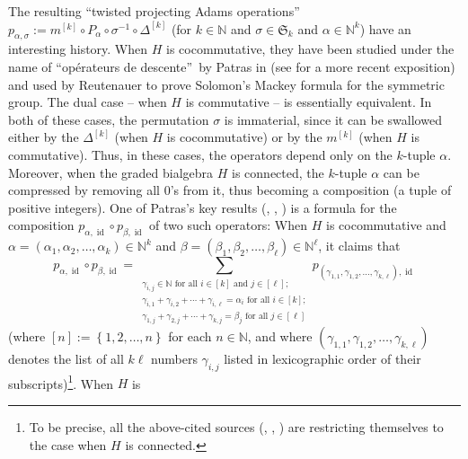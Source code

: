 \documentclass[numbers=enddot,12pt,final,onecolumn,notitlepage]{scrartcl}%
\theoremstyle{definition}
\let\sumnonlimits\sum
\renewcommand{\sum}{\sumnonlimits\limits}
\begin{document}
The resulting \textquotedblleft twisted projecting Adams
operations\textquotedblright\ $p_{\alpha,\sigma}:=m^{\left[  k\right]  }\circ
P_{\alpha}\circ\sigma^{-1}\circ\Delta^{\left[  k\right]  }$ (for
$k\in\mathbb{N}$ and $\sigma\in\mathfrak{S}_{k}$ and $\alpha\in\mathbb{N}^{k}%
$) have an interesting history. When $H$ is cocommutative, they have been
studied under the name of \textquotedblleft op\'{e}rateurs de
descente\textquotedblright\ by Patras in \cite{Patras94} (see \cite[\S 5.1]%
{CarPat21} for a more recent exposition) and used by Reutenauer \cite[\S 9.1]%
{Reuten93} to prove Solomon's Mackey formula for the symmetric group. The dual
case -- when $H$ is commutative -- is essentially equivalent. In both of these
cases, the permutation $\sigma$ is immaterial, since it can be swallowed
either by the $\Delta^{\left[  k\right]  }$ (when $H$ is cocommutative) or by
the $m^{\left[  k\right]  }$ (when $H$ is commutative). Thus, in these cases,
the operators depend only on the $k$-tuple $\alpha$. Moreover, when the graded
bialgebra $H$ is connected, the $k$-tuple $\alpha$ can be compressed by
removing all $0$'s from it, thus becoming a composition (a tuple of positive
integers). One of Patras's key results (\cite[Th\'{e}or\`{e}me II,7]%
{Patras94}, \cite[Theorem 9.2]{Reuten93}, \cite[Theorem 5.1.1]{CarPat21}) is a
formula for the composition $p_{\alpha,\operatorname*{id}}\circ p_{\beta
,\operatorname*{id}}$ of two such operators: When $H$ is cocommutative and
$\alpha=\left(  \alpha_{1},\alpha_{2},\ldots,\alpha_{k}\right)  \in
\mathbb{N}^{k}$ and $\beta=\left(  \beta_{1},\beta_{2},\ldots,\beta_{\ell
}\right)  \in\mathbb{N}^{\ell}$, it claims that%
\begin{equation}
p_{\alpha,\operatorname*{id}}\circ p_{\beta,\operatorname*{id}}=\sum
_{\substack{\gamma_{i,j}\in\mathbb{N}\text{ for all }i\in\left[  k\right]
\text{ and }j\in\left[  \ell\right]  ;\\\gamma_{i,1}+\gamma_{i,2}%
+\cdots+\gamma_{i,\ell}=\alpha_{i}\text{ for all }i\in\left[  k\right]
;\\\gamma_{1,j}+\gamma_{2,j}+\cdots+\gamma_{k,j}=\beta_{j}\text{ for all }%
j\in\left[  \ell\right]  }}p_{\left(  \gamma_{1,1},\gamma_{1,2},\ldots
,\gamma_{k,\ell}\right)  ,\operatorname*{id}} \label{eq.intro.pp=sum.cocomm}%
\end{equation}
(where $\left[  n\right]  :=\left\{  1,2,\ldots,n\right\}  $ for each
$n\in\mathbb{N}$, and where $\left(  \gamma_{1,1},\gamma_{1,2},\ldots
,\gamma_{k,\ell}\right)  $ denotes the list of all $k\ell$ numbers
$\gamma_{i,j}$ listed in lexicographic order of their subscripts)\footnote{To
be precise, all the above-cited sources (\cite[Th\'{e}or\`{e}me II,7]%
{Patras94}, \cite[Theorem 9.2]{Reuten93}, \cite[Theorem 5.1.1]{CarPat21}) are
restricting themselves to the case when $H$ is connected.}. When $H$ is
\end{document}
